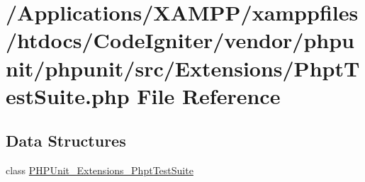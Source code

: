 \hypertarget{_phpt_test_suite_8php}{}\section{/\+Applications/\+X\+A\+M\+P\+P/xamppfiles/htdocs/\+Code\+Igniter/vendor/phpunit/phpunit/src/\+Extensions/\+Phpt\+Test\+Suite.php File Reference}
\label{_phpt_test_suite_8php}
\subsection*{Data Structures}
\begin{DoxyCompactItemize}
\item 
class \mbox{\hyperlink{class_p_h_p_unit___extensions___phpt_test_suite}{P\+H\+P\+Unit\+\_\+\+Extensions\+\_\+\+Phpt\+Test\+Suite}}
\end{DoxyCompactItemize}
